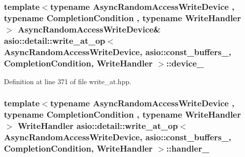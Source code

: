 \subsubsection[{device\+\_\+}]{\setlength{\rightskip}{0pt plus 5cm}template$<$typename Async\+Random\+Access\+Write\+Device , typename Completion\+Condition , typename Write\+Handler $>$ Async\+Random\+Access\+Write\+Device\& {\bf asio\+::detail\+::write\+\_\+at\+\_\+op}$<$ Async\+Random\+Access\+Write\+Device, {\bf asio\+::const\+\_\+buffers\+\_},                           Completion\+Condition, Write\+Handler $>$\+::device\+\_\+}\label{classasio_1_1detail_1_1write__at__op_3_01_async_random_access_write_device_00_01asio_1_1const__bfac42b27d8d08bd8bf66a7fd473767cd_a96bc711fd8e152cf2f15542ce3f800f7}


Definition at line 371 of file write\+\_\+at.\+hpp.

\hypertarget{classasio_1_1detail_1_1write__at__op_3_01_async_random_access_write_device_00_01asio_1_1const__bfac42b27d8d08bd8bf66a7fd473767cd_afa760b6c053b644807af8cc304dd463f}{}
\subsubsection[{handler\+\_\+}]{\setlength{\rightskip}{0pt plus 5cm}template$<$typename Async\+Random\+Access\+Write\+Device , typename Completion\+Condition , typename Write\+Handler $>$ Write\+Handler {\bf asio\+::detail\+::write\+\_\+at\+\_\+op}$<$ Async\+Random\+Access\+Write\+Device, {\bf asio\+::const\+\_\+buffers\+\_},                           Completion\+Condition, Write\+Handler $>$\+::handler\+\_\+}\label{classasio_1_1detail_1_1write__at__op_3_01_async_random_access_write_device_00_01asio_1_1const__bfac42b27d8d08bd8bf66a7fd473767cd_afa760b6c053b644807af8cc304dd463f}


